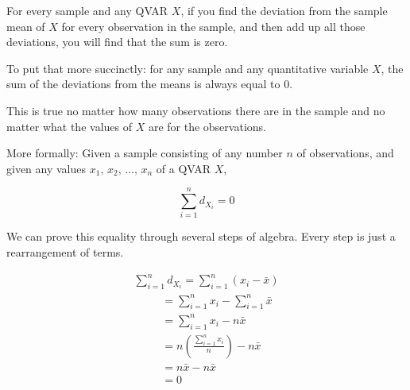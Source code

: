 \documentclass[
  letterpaper,
  DIV=11,
  numbers=noendperiod]{scrartcl}
\begin{document}
\begin{tcolorbox}[enhanced jigsaw, colback=white, breakable, opacityback=0, leftrule=.75mm, arc=.35mm, colframe=quarto-callout-tip-color-frame, title=\textcolor{quarto-callout-tip-color}{\faLightbulb}\hspace{0.5em}{Fact}, left=2mm, rightrule=.15mm, bottomtitle=1mm, coltitle=black, titlerule=0mm, bottomrule=.15mm, toptitle=1mm, colbacktitle=quarto-callout-tip-color!10!white, opacitybacktitle=0.6, toprule=.15mm]

For every sample and any QVAR \(X\), if you find the deviation from the
sample mean of \(X\) for every observation in the sample, and then add
up all those deviations, you will find that the sum is zero.

\end{tcolorbox}

To put that more succinctly: for any sample and any quantitative
variable \(X\), the sum of the deviations from the means is always equal
to 0.

This is true no matter how many observations there are in the sample and
no matter what the values of \(X\) are for the observations.

More formally: Given a sample consisting of any number \(n\) of
observations, and given any values \(x_1,\,x_2,\,...,\,x_n\) of a QVAR
\(X\),

\[\sum_{i = 1}^n d_{X_i} = 0\]

\begin{tcolorbox}[enhanced jigsaw, colback=white, breakable, opacityback=0, leftrule=.75mm, arc=.35mm, colframe=quarto-callout-tip-color-frame, title=\textcolor{quarto-callout-tip-color}{\faLightbulb}\hspace{0.5em}{Proof of this fact}, left=2mm, rightrule=.15mm, bottomtitle=1mm, coltitle=black, titlerule=0mm, bottomrule=.15mm, toptitle=1mm, colbacktitle=quarto-callout-tip-color!10!white, opacitybacktitle=0.6, toprule=.15mm]

We can prove this equality through several steps of algebra. Every step
is just a rearrangement of terms.

\[\begin{array}{l}
\sum_{i = 1}^n d_{X_i} = \sum_{i = 1}^n \left( x_i - \bar{x} \right) \\
\,\,\,\,\,\,\,\,\,\,\,\,\,\,\, = \sum_{i = 1}^n x_i - \sum_{i = 1}^n \bar{x} \\
\,\,\,\,\,\,\,\,\,\,\,\,\,\,\, = \sum_{i = 1}^n x_i - n \bar{x} \\
\,\,\,\,\,\,\,\,\,\,\,\,\,\,\, = n \left( \frac{\sum_{i = 1}^n x_i}{n} \right) - n \bar{x} \\
\,\,\,\,\,\,\,\,\,\,\,\,\,\,\, = n \bar{x} - n \bar{x} \\
\,\,\,\,\,\,\,\,\,\,\,\,\,\,\, = 0
\end{array}\]

\end{tcolorbox}
\end{document}
